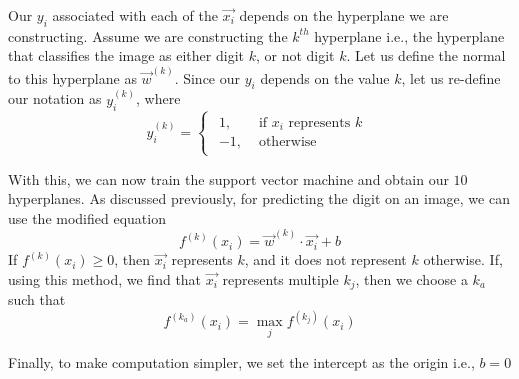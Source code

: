 Our ${y_i}$ associated with each of the $\vec{x_i}$ depends on the hyperplane we are constructing. Assume we are constructing the $k^{th}$ hyperplane i.e., the hyperplane that classifies the image as either digit $k$, or not digit $k$. Let us define the normal to this hyperplane as $\vec{w}^{(k)}$. Since our $y_i$ depends on the value $k$, let us re-define our notation as $y^{(k)}_i$, where
\begin{equation*}
    y^{(k)}_i= 
\begin{cases}
\begin{aligned}
 1,& \text{ if } x_i \text{ represents } k\\
-1,              & \text{ otherwise}
\end{aligned}
\end{cases}
\end{equation*}

With this, we can now train the support vector machine and obtain our $10$ hyperplanes. As discussed previously, for predicting the digit on an image, we can use the modified equation
\begin{equation*}
	f^{(k)}(x_i) = \vec{w}^{(k)}\cdot\vec{x_i} + b
\end{equation*}
If $f^{(k)}(x_i) \geq 0$, then $\vec{x_i}$ represents $k$, and it does not represent $k$ otherwise. If, using this method, we find that $\vec{x_i}$ represents multiple $k_j$, then we choose a $k_a$ such that
\begin{equation*}
	f^{(k_a)}(x_i) = \max_{j} f^{(k_j)}(x_i)
\end{equation*}

Finally, to make computation simpler, we set the intercept as the origin i.e., $b = 0$